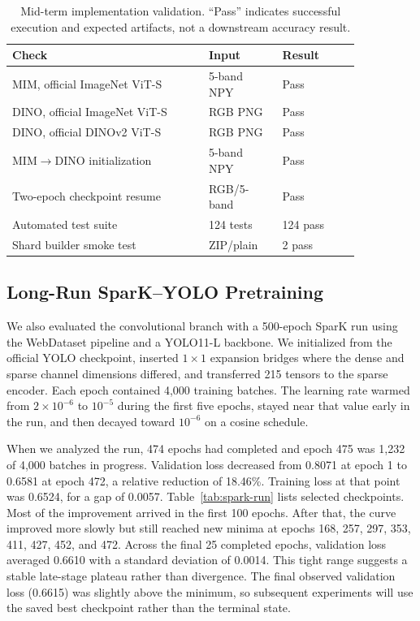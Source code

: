 \documentclass[10pt,twocolumn,letterpaper]{article}
\begin{document}
\begin{table}[t]
\centering
\caption{Mid-term implementation validation. ``Pass'' indicates successful
execution and expected artifacts, not a downstream accuracy result.}
\label{tab:results}
\small
\begin{tabular}{p{0.48\linewidth}p{0.18\linewidth}p{0.19\linewidth}}
\toprule
Check & Input & Result \\
\midrule
MIM, official ImageNet ViT-S & 5-band NPY & Pass \\
DINO, official ImageNet ViT-S & RGB PNG & Pass \\
DINO, official DINOv2 ViT-S & RGB PNG & Pass \\
MIM$\rightarrow$DINO initialization & 5-band NPY & Pass \\
Two-epoch checkpoint resume & RGB/5-band & Pass \\
Automated test suite & 124 tests & 124 pass \\
Shard builder smoke test & ZIP/plain & 2 pass \\
\bottomrule
\end{tabular}
\end{table}


\subsection{Long-Run SparK--YOLO Pretraining}
We also evaluated the convolutional branch with a 500-epoch SparK run using the
WebDataset pipeline and a YOLO11-L backbone. We initialized from the official
YOLO checkpoint, inserted $1\!\times\!1$ expansion bridges where the dense and
sparse channel dimensions differed, and transferred 215 tensors to the sparse
encoder. Each epoch contained 4,000 training batches. The learning rate warmed
from $2\!\times\!10^{-6}$ to $10^{-5}$ during the first five epochs, stayed near
that value early in the run, and then decayed toward $10^{-6}$ on a cosine
schedule.

When we analyzed the run, 474 epochs had completed and epoch 475 was 1,232 of
4,000 batches in progress. Validation loss decreased from 0.8071 at epoch 1 to
0.6581 at epoch 472, a relative reduction of 18.46\%. Training loss at that
point was 0.6524, for a gap of 0.0057. Table~\ref{tab:spark-run} lists selected
checkpoints. Most of the improvement arrived in the first 100 epochs. After
that, the curve improved more slowly but still reached new minima at epochs 168,
257, 297, 353, 411, 427, 452, and 472. Across the final 25 completed epochs,
validation loss averaged 0.6610 with a standard deviation of 0.0014. This tight
range suggests a stable late-stage plateau rather than divergence. The final
observed validation loss (0.6615) was slightly above the minimum, so subsequent
experiments will use the saved best checkpoint rather than the terminal state.
\end{document}

